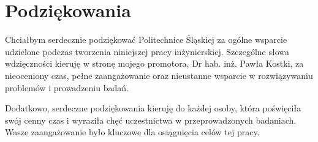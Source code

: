 \chapter{Podziękowania}
Chciałbym serdecznie podziękować Politechnice Śląskiej za ogólne wsparcie udzielone podczas tworzenia niniejszej pracy inżynierskiej. Szczególne słowa wdzięczności kieruję w stronę mojego promotora, Dr hab. inż. Pawła Kostki, za nieoceniony czas, pełne zaangażowanie oraz nieustanne wsparcie w rozwiązywaniu problemów i prowadzeniu badań.

Dodatkowo, serdeczne podziękowania kieruję do każdej osoby, która poświęciła swój cenny czas i wyraziła chęć uczestnictwa w przeprowadzonych badaniach. Wasze zaangażowanie było kluczowe dla osiągnięcia celów tej pracy.